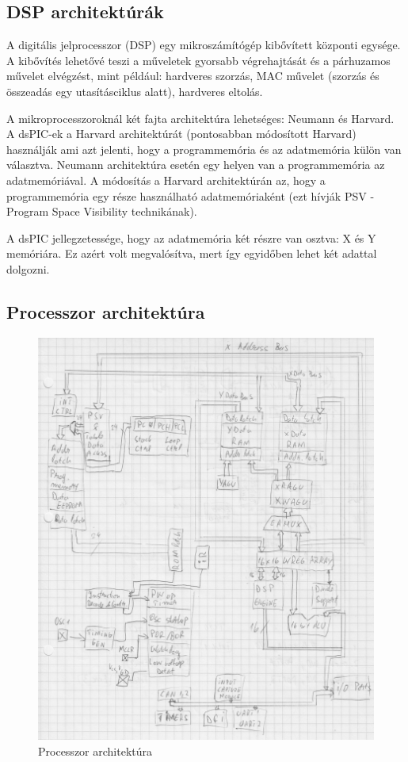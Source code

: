 \subsection{DSP architektúrák}

A digitális jelprocesszor (DSP) egy mikroszámítógép kibővített központi egysége. A kibővítés lehetővé teszi a műveletek gyorsabb végrehajtását és a párhuzamos művelet elvégzést, mint például: hardveres szorzás, MAC művelet (szorzás és összeadás egy utasításciklus alatt), hardveres eltolás.

A mikroprocesszoroknál két fajta architektúra lehetséges: Neumann és Harvard. A dsPIC-ek a Harvard architektúrát (pontosabban módosított Harvard) használják ami azt jelenti, hogy a programmemória és az adatmemória külön van választva. Neumann architektúra esetén egy helyen van a programmemória az adatmemóriával. A módosítás a Harvard architektúrán az, hogy a programmemória egy része használható adatmemóriaként (ezt hívják PSV - Program Space Visibility technikának).

A dsPIC jellegzetessége, hogy az adatmemória két részre van osztva: X és Y memóriára. Ez azért volt megvalósítva, mert így egyidőben lehet két adattal dolgozni.

\subsection{Processzor architektúra}

\begin{figure}[H]
    \centering
    \includegraphics[scale=0.13]{figures/dsp_cpu.jpg}
    \caption{Processzor architektúra}
\end{figure}


